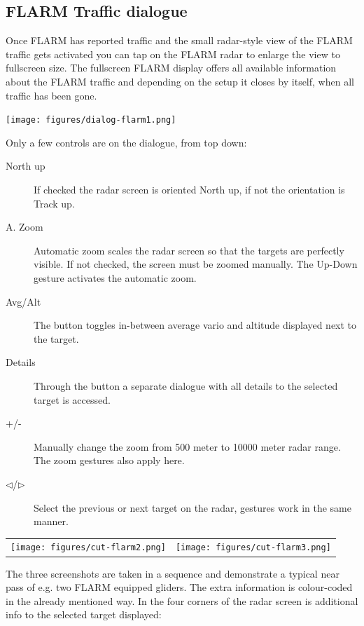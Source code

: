 \subsection*{FLARM Traffic dialogue}\label{sec:flarm-traffic}

Once FLARM has reported traffic and the small radar-style view of the FLARM
traffic gets activated   you can tap on the FLARM radar to
enlarge the view to fullscreen size.  
The fullscreen FLARM display offers all available information
about the FLARM traffic and depending on the setup it closes by itself, when all
traffic has been gone.

\begin{center}
\texttt{[image: figures/dialog-flarm1.png]}
\end{center}

Only a few controls are on the dialogue, from top down:
\begin{description}
\item[North up]  If checked the radar screen is oriented North up, if not the
orientation is Track up.
\item[A. Zoom]   Automatic zoom scales the radar screen so
that the targets are perfectly visible. If not checked, the screen must be
zoomed manually. The Up-Down gesture activates the automatic zoom. 
\item[Avg/Alt]   The button toggles in-between average
vario and altitude displayed next to the target.
\item[Details]   Through the button a separate dialogue with
all details to the selected target is accessed. 
\item[+/-]   Manually change the zoom from 500 meter to
10000 meter radar range. The zoom gestures also apply here.
\item[$\triangleleft$/$\triangleright$]   Select the
previous or next target on the radar, gestures work in the same manner.
\end{description}

\begin{center}
\begin{tabular}{c c}
\texttt{[image: figures/cut-flarm2.png]}&
\texttt{[image: figures/cut-flarm3.png]}\\
\end{tabular}
\end{center}
The three screenshots are taken in a sequence and demonstrate a typical near
pass of e.g. two FLARM equipped gliders. The extra information is colour-coded
in the already mentioned way. In the four corners of the radar screen is
additional info to the selected target displayed:

